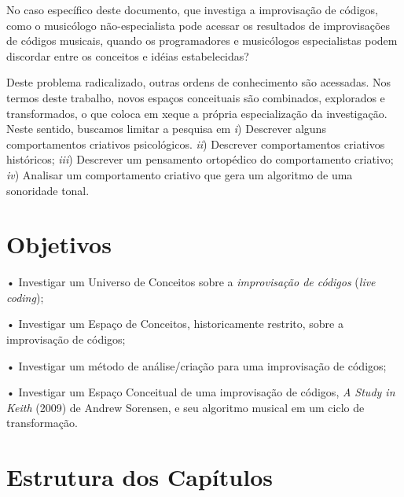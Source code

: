 No caso específico deste documento, que investiga a improvisação de códigos, como o musicólogo não-especialista pode acessar os resultados de improvisações de códigos musicais, quando os programadores e musicólogos especialistas podem discordar entre os conceitos e idéias estabelecidas? 

Deste problema radicalizado, outras ordens de conhecimento são acessadas. Nos termos deste trabalho, novos espaços conceituais são combinados, explorados e transformados, o que coloca em xeque a própria especialização da investigação. Neste sentido, buscamos limitar a pesquisa em \emph{i}) Descrever alguns comportamentos criativos psicológicos. \emph{ii}) Descrever comportamentos criativos históricos; \emph{iii}) Descrever um pensamento ortopédico do comportamento criativo; \emph{iv}) Analisar um comportamento criativo que gera um algoritmo de uma sonoridade tonal. 

\section*{Objetivos}\label{sec:objetivos}

• Investigar um Universo de Conceitos sobre a \emph{improvisação de códigos} (\emph{live coding});

• Investigar um Espaço de Conceitos, historicamente restrito, sobre a improvisação de códigos;

• Investigar um método de análise/criação para uma improvisação de códigos;

• Investigar um Espaço Conceitual de uma improvisação de códigos, \emph{A Study in Keith} (2009) de Andrew Sorensen, e seu algoritmo musical em um ciclo de transformação.

\section*{Estrutura dos Capítulos}


